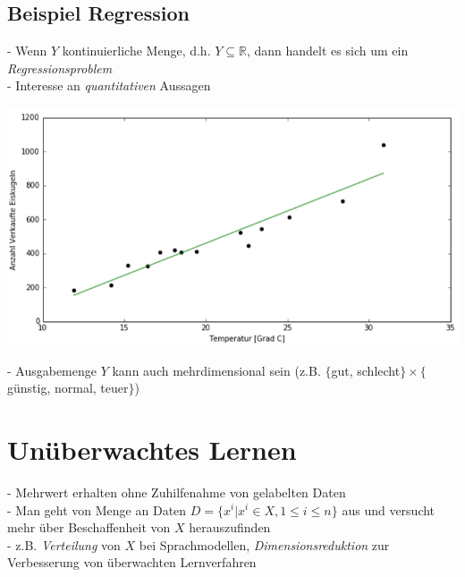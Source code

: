 \documentclass{report}
\begin{document}
  \subsection{Beispiel Regression}	
  - Wenn $Y$ kontinuierliche Menge, d.h. $Y \subseteq \mathbb{R}$, dann handelt es sich um ein \textit{Regressionsproblem}\\	
  - Interesse an \textit{quantitativen} Aussagen\\	
  \begin{center}	
    \includegraphics[scale=.4]{ml01_3}	
  \end{center}	
  - Ausgabemenge $Y$ kann auch mehrdimensional sein (z.B. $\{$gut, schlecht$\}\times \{$günstig, normal, teuer$\}$)	
  
  \section{Unüberwachtes Lernen}	
  - Mehrwert erhalten ohne Zuhilfenahme von gelabelten Daten\\	
  - Man geht von Menge an Daten $D = \{x^i|x^i \in X, 1 \leq i \leq n\}$ aus und versucht mehr über Beschaffenheit von $X$ herauszufinden\\	
  - z.B. \textit{Verteilung} von $X$ bei Sprachmodellen, \textit{Dimensionsreduktion} zur Verbesserung von überwachten Lernverfahren	
  
\end{document}
